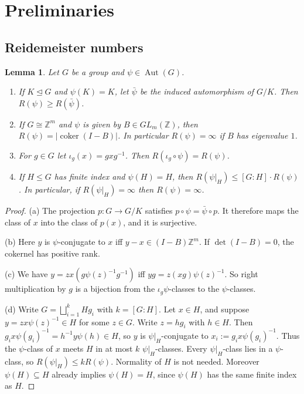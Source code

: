 \documentclass[11pt]{amsart}
\newtheorem{lemma}[theorem]{Lemma}
\theoremstyle{definition}
\newcommand{\Z}{\mathbb{Z}}
\newcommand{\Aut}{\operatorname{Aut}}
\newcommand{\coker}{\operatorname{coker}}
\begin{document}
\section{Preliminaries}

\subsection{Reidemeister numbers}
\begin{lemma}\label{lem:reid}
Let $G$ be a group and $\psi\in\Aut(G)$.
\begin{enumerate}[label=(\alph*)]
\item If $K\trianglelefteq G$ and $\psi(K)=K$, let $\bar\psi$ be the induced automorphism of $G/K$. Then
$R(\psi)\ge R(\bar\psi)$.
\item If $G\cong\Z^m$ and $\psi$ is given by $B\in GL_m(\Z)$, then $R(\psi)=|\coker(I-B)|$. In particular
$R(\psi)=\infty$ if $B$ has eigenvalue $1$.
\item For $g\in G$ let $\iota_g(x)=gxg^{-1}$. Then $R(\iota_g\circ\psi)=R(\psi)$.
\item If $H\le G$ has finite index and $\psi(H)=H$, then $R(\psi|_H)\le[G:H]\cdot R(\psi)$. In particular, if
$R(\psi|_H)=\infty$ then $R(\psi)=\infty$.
\end{enumerate}
\end{lemma}

\begin{proof}
(a) The projection $p\colon G\to G/K$ satisfies $p\circ\psi=\bar\psi\circ p$. It therefore maps the class of
$x$ into the class of $p(x)$, and it is surjective.

(b) Here $y$ is $\psi$-conjugate to $x$ iff $y-x\in(I-B)\Z^m$. If $\det(I-B)=0$, the cokernel has positive rank.

(c) We have $y=z x(g\psi(z)^{-1}g^{-1})$ iff $yg=z(xg)\psi(z)^{-1}$. So right multiplication by $g$ is a
bijection from the $\iota_g\psi$-classes to the $\psi$-classes.

(d) Write $G=\bigsqcup_{i=1}^k Hg_i$ with $k=[G:H]$. Let $x\in H$, and suppose $y=zx\psi(z)^{-1}\in H$ for some
$z\in G$. Write $z=hg_i$ with $h\in H$. Then $g_ix\psi(g_i)^{-1}=h^{-1}y\psi(h)\in H$, so $y$ is
$\psi|_H$-conjugate to $x_i:=g_ix\psi(g_i)^{-1}$. Thus the $\psi$-class of $x$ meets $H$ in at most $k$
$\psi|_H$-classes. Every $\psi|_H$-class lies in a $\psi$-class, so $R(\psi|_H)\le kR(\psi)$. Normality of
$H$ is not needed. Moreover $\psi(H)\subseteq H$ already implies $\psi(H)=H$, since $\psi(H)$ has the same
finite index as $H$.
\end{proof}
\end{document}
